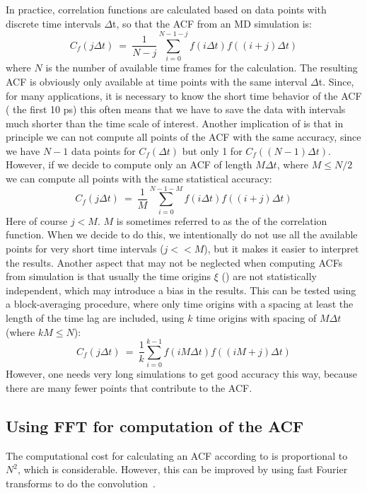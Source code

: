 In practice, correlation functions are calculated based on data points with
discrete time intervals {$\Delta$t}, so that the ACF from an MD simulation is:
\begin{equation}
C_f(j\Delta t)  ~=~     \frac{1}{N-j}\sum_{i=0}^{N-1-j} f(i\Delta t) f((i+j)\Delta t)
\label{eqn:corrmd}
\end{equation}
where $N$ is the number of available time frames for the calculation.
The resulting ACF is
obviously only available at time points with the same interval {$\Delta$t}.
Since, for many applications, it is necessary to know the short time behavior
of the ACF ({\eg} the first 10 ps) this often means that we have to save the
data with intervals much shorter than the time scale of interest.
Another implication of  is that in principle we can not compute
all points of the ACF with the same accuracy, since we have $N-1$ data points
for $C_f(\Delta t)$ but only 1 for $C_f((N-1)\Delta t)$. However, if we decide to
compute only an ACF of length $M\Delta t$, where $M \leq N/2$ we can compute 
all points with the same statistical accuracy:
\begin{equation}
C_f(j\Delta t)  ~=~ \frac{1}{M}\sum_{i=0}^{N-1-M} f(i\Delta t)f((i+j)\Delta t)
\end{equation}
Here of course $j < M$.
$M$ is sometimes referred to as the  of the correlation function. 
When we decide to do this, we intentionally do not use all the available points
for very short time intervals ($j << M$), but it makes it easier to interpret
the results.
Another aspect that may not be neglected when computing
ACFs from simulation is that usually the time origins $\xi$ ()
are not statistically independent, which may introduce a bias in the results.
This can be tested using a block-averaging procedure, where only time origins
with a spacing at least the length of the time lag are included, {\eg} using 
$k$ time origins with spacing of $M\Delta t$ (where $kM \leq N$):
\begin{equation}
C_f(j\Delta t)  ~=~ \frac{1}{k}\sum_{i=0}^{k-1} f(iM\Delta t)f((iM+j)\Delta t)
\end{equation}
However, one
needs very long simulations to get good accuracy this way, because there are 
many fewer points that contribute to the ACF.

\subsection{Using FFT for computation of the ACF}
The computational cost for calculating an ACF according to 
is proportional to $N^2$, which is considerable. However, this can be improved
by using fast Fourier transforms to do the convolution~\cite{Allen87}.


